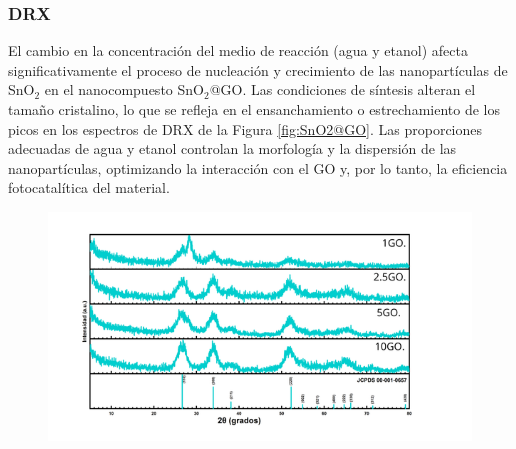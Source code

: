 \documentclass[12pt]{article}
\begin{document}
\subsubsection{DRX} 

 El cambio en la concentración del medio de reacción (agua y etanol) afecta significativamente el proceso de nucleación y crecimiento de las nanopartículas de SnO$\displaystyle _{2}$  en el nanocompuesto SnO$\displaystyle _{2}$@GO. Las condiciones de síntesis alteran el tamaño cristalino, lo que se refleja en el ensanchamiento o estrechamiento de los picos en los espectros de DRX de la Figura \ref{fig:SnO2@GO}. Las proporciones adecuadas de agua y etanol controlan la morfología y la dispersión de las nanopartículas, optimizando la interacción con el GO y, por lo tanto, la eficiencia fotocatalítica del material.

 \begin{figure}[H]
    	   \begin{center}
     	  	\includegraphics[width = 1.1\textwidth]{Imagenes/SnO2_decorado_xrd.png}
    	   \end{center} 
        \end{figure}
 
\end{document}
